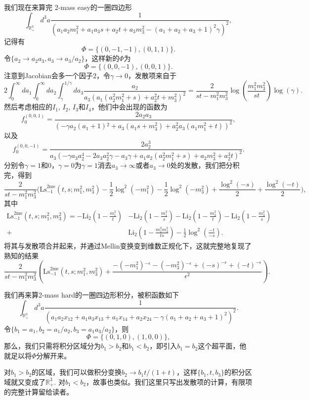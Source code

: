 \documentclass[12pt]{article}
\theoremstyle{definition}
\theoremstyle{plain}
\begin{document}
我们现在来算完 2-mass easy的一圈四边形
\[
	\int_{\mathbb R_+^3}d^3a\frac{1}{(a_1a_2 m_1^2+a_1a_3s+a_2t+a_3m_3^2-(a_1+a_2+a_3+1)^2\gamma)^2},
\]
记得有
\[
	\Phi=\{(0, -1, -1), (0, 1, 1)\}.
\]
令$\{a_2\to a_2a_3,a_3\to a_3/a_2\}$，这样新的$\Phi$为
\[
	\Phi=\{(0, 0, -1), (0, 0, 1)\}.
\]
注意到Jacobian会多一个因子$2$，令$\gamma\to 0$，发散项来自于
\[
	2\int_0^\infty da_1\int_0^\infty da_2\int_{\gamma}^{1/\gamma} da_3\frac{a_2}{a_3 \left(a_1 \left(a_2^2 m_1^2+s\right)+a_2^2 t+m_3^2\right)^2}=\frac{2}{s t-m_1^2 m_3^2}\log \left(\frac{m_1^2 m_3^2}{s t}\right)\log(\gamma).
\]
然后考虑相应的$I_1$, $I_2$, $I_3$和$I_4$，他们中会出现的函数为
\[
	f^{(0,0,1)}_{0}=\frac{2 a_2 a_3}{\left(-\gamma a_2 \left(a_1+1\right){}^2 +a_3 \left(a_1 s+m_3^2\right)+a_2^2 a_3 \left(a_1 m_1^2+t\right)\right)^2},
\]
以及
\[
	f^{(0,0,-1)}_0=\frac{2 a_2^3}{a_3 \left(-\gamma a_3 a_2^4 -2 a_3 a_2^2 \gamma -a_3 \gamma +a_1 a_2 \left(a_2^2 m_1^2+s\right)+a_2 m_3^2+a_2^3 t\right)^2}.
\]
分别令$\gamma=1$和$0$，$\gamma=0$为$\gamma=1$消去$a_3\to \infty$或者$a_3\to 0$处的发散，我们把分积完，得到
\[
	\frac{2}{s t-m_1^2 m_3^2}\biggl(\mathrm{Ls}_{-1}^{\text{2me}}\left(t, s ; m_1^2, m_3^2\right)-\frac{1}{2} \log ^2\left(-m_1^2\right)-\frac{1}{2} \log ^2\left(-m_3^2\right)+\frac{\log ^2(-s)}{2}+\frac{\log ^2(-t)}{2}\biggr),
\]
其中
\[
	\begin{aligned}
		\mathrm{Ls}_{-1}^{\text{2me}}\left(t, s ; m_1^2, m_3^2\right)=-\mathrm{Li}_{2}\left(1-\frac{m_1^2}{t}\right) &-\mathrm{Li}_{2}\left(1-\frac{m_1^2}{s}\right)-\mathrm{Li}_{2}\left(1-\frac{m_3^2}{t}\right)-\mathrm{Li}_{2}\left(1-\frac{m_3^2}{s}\right) \\
		+& \mathrm{Li}_{2}\left(1-\frac{m_1^2 m_3^2}{t s}\right)-\frac{1}{2} \log ^{2}\left(\frac{-t}{-s}\right) .
		\end{aligned}
\]
将其与发散项合并起来，并通过Mellin变换变到维数正规化下，这就完整地复现了熟知的结果
\[
	\frac{2}{s t-m_1^2 m_3^2} \left(\mathrm{Ls}_{-1}^{\text{2me}}\left(t, s ; m_1^2, m_3^2\right)+\frac{-\left(-m_1^2\right){}^{-\epsilon}-\left(-m_3^2\right){}^{-\epsilon}+(-s)^{-\epsilon}+(-t)^{-\epsilon}}{\epsilon^2}\right).
\]

我们再来算2-mass hard的一圈四边形积分，被积函数如下
\[
	\int_{\mathbb R_+^3}d^3a\frac{1}{(a_1 a_2 x_{12}+a_1 a_3 x_{13}+a_1 x_{14}+a_2 x_{24}-\gamma (a_1+a_2+a_3+1)^2)^2}.
\]
令$\{b_1=a_1,b_2=a_1/a_2,b_3=a_1 a_3/a_2\}$，则
\[
	\Phi=\{(0,1,0),(1,0,0)\},
\]
那么，我们只需将积分区域分为$b_1>b_2$和$b_1<b_2$，即引入$b_1=b_2$这个超平面，他就足以将$\Phi$分解开来。

对$b_1>b_2$的区域，我们可以做积分变换$b_2\to b_1 t/(1+t)$，这样$\{b_1,t,b_3\}$的积分区域就又变成了$\mathbb R_+^3$. 对$b_1<b_2$，故事也类似。我们这里只写出发散项的计算，有限项的完整计算留给读者。
\end{document}

